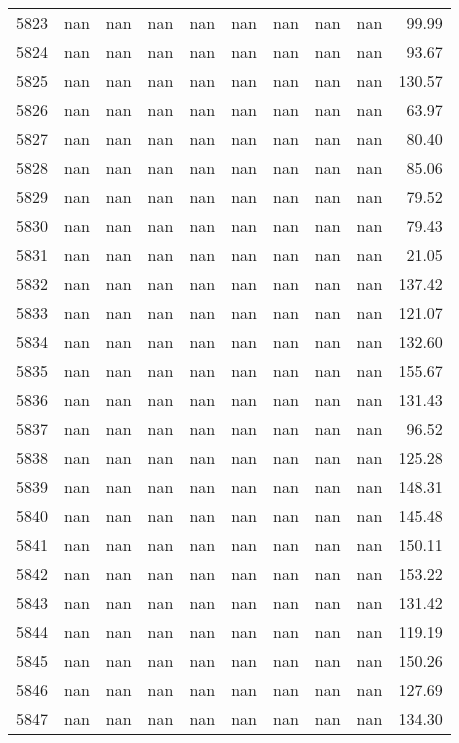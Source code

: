 \begin{tabular}{lrrrrrrrrr}
5823 & nan & nan & nan & nan & nan & nan & nan & nan & 99.99 \\
5824 & nan & nan & nan & nan & nan & nan & nan & nan & 93.67 \\
5825 & nan & nan & nan & nan & nan & nan & nan & nan & 130.57 \\
5826 & nan & nan & nan & nan & nan & nan & nan & nan & 63.97 \\
5827 & nan & nan & nan & nan & nan & nan & nan & nan & 80.40 \\
5828 & nan & nan & nan & nan & nan & nan & nan & nan & 85.06 \\
5829 & nan & nan & nan & nan & nan & nan & nan & nan & 79.52 \\
5830 & nan & nan & nan & nan & nan & nan & nan & nan & 79.43 \\
5831 & nan & nan & nan & nan & nan & nan & nan & nan & 21.05 \\
5832 & nan & nan & nan & nan & nan & nan & nan & nan & 137.42 \\
5833 & nan & nan & nan & nan & nan & nan & nan & nan & 121.07 \\
5834 & nan & nan & nan & nan & nan & nan & nan & nan & 132.60 \\
5835 & nan & nan & nan & nan & nan & nan & nan & nan & 155.67 \\
5836 & nan & nan & nan & nan & nan & nan & nan & nan & 131.43 \\
5837 & nan & nan & nan & nan & nan & nan & nan & nan & 96.52 \\
5838 & nan & nan & nan & nan & nan & nan & nan & nan & 125.28 \\
5839 & nan & nan & nan & nan & nan & nan & nan & nan & 148.31 \\
5840 & nan & nan & nan & nan & nan & nan & nan & nan & 145.48 \\
5841 & nan & nan & nan & nan & nan & nan & nan & nan & 150.11 \\
5842 & nan & nan & nan & nan & nan & nan & nan & nan & 153.22 \\
5843 & nan & nan & nan & nan & nan & nan & nan & nan & 131.42 \\
5844 & nan & nan & nan & nan & nan & nan & nan & nan & 119.19 \\
5845 & nan & nan & nan & nan & nan & nan & nan & nan & 150.26 \\
5846 & nan & nan & nan & nan & nan & nan & nan & nan & 127.69 \\
5847 & nan & nan & nan & nan & nan & nan & nan & nan & 134.30 \\

\end{tabular}
